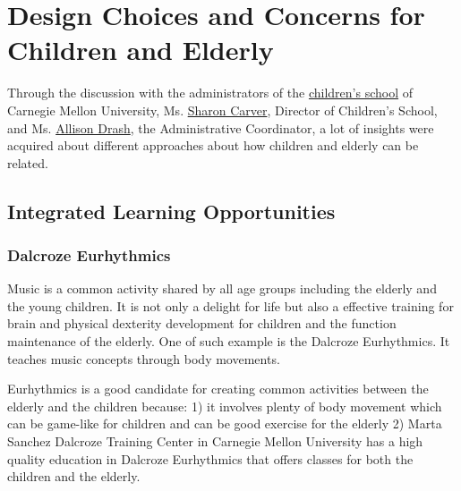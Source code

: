 \section{Design Choices and Concerns for Children and Elderly}
Through the discussion with the administrators of the
\href{http://www.psy.cmu.edu/cs/}{children's school} of Carnegie
Mellon University,
Ms. \href{http://www.psy.cmu.edu/cs/people/carver.html}{Sharon
  Carver}, Director of Children's School, and
Ms. \href{http://www.psy.cmu.edu/cs/people/drash.html}{Allison Drash},
the Administrative Coordinator, a lot of insights were acquired about
different approaches about how children and elderly can be related.
\subsection{Integrated Learning Opportunities}
\subsubsection{Dalcroze Eurhythmics}
Music is a common activity shared by all age groups including the elderly and the young children. It is not only a delight for life but also a effective training for brain and physical dexterity development for children and the function maintenance of the elderly. One of such example is the Dalcroze Eurhythmics. It teaches music concepts through body movements.

Eurhythmics is a good candidate for creating common activities between the elderly and the children because: 1) it involves plenty of body movement which can be game-like for children and can be good exercise for the elderly 2) Marta Sanchez Dalcroze Training Center in Carnegie Mellon University has a high quality education in Dalcroze Eurhythmics that offers classes for both the children and the elderly.
